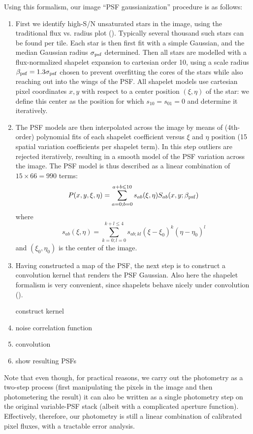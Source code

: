 Using this formalism, our image ``PSF gaussianization'' procedure is as follows:
\begin{enumerate}
\item
First we identify high-S/N unsaturated stars in the image, using the traditional flux vs. radius plot (\cite{KSB}). Typically several thousand such stars can be found per tile. Each star is then first fit with a simple Gaussian, and the median Gaussian radius $\sigma_{\rm psf}$ determined.  
Then all stars are modelled with a flux-normalized shapelet expansion to cartesian order 10, using a scale radius $\beta_{\rm psf}=1.3 \sigma_{\rm psf}$ chosen to prevent overfitting the cores of the stars while also reaching out into the wings of the PSF. All shapelet models use cartesian pixel coordinates $x,y$ with respect to a center position $(\xi,\eta)$ of the star: we define this center as the position for which $s_{10}=s_{01}=0$ and determine it iteratively.
\item
The PSF models are then interpolated across the image by means of (4th-order) polynomial fits of each shapelet coefficient versus $\xi$ and $\eta$ position (15 spatial variation coefficients per shapelet term). In this step outliers are rejected iteratively, resulting in a smooth model of the PSF variation across the image. The PSF model is thus described as a linear combination of $15\times66=990$ terms:
\[
P(x,y,\xi,\eta)=\sum_{a=0;b=0}^{a+b\le10} s_{ab} (\xi,\eta) S_{ab}(x,y;\beta_{\rm psf})
\]
where
\[
s_{ab}(\xi,\eta)=\sum_{k=0;l=0}^{k+l\le4} s_{ab;kl} (\xi-\xi_0)^k (\eta-\eta_0)^l 
\]
and $(\xi_0,\eta_0)$ is the center of the image.
\item
Having constructed a map of the PSF, the next step is to construct a convolution kernel that renders the PSF Gaussian. Also here the shapelet formalism is very convenient, since shapelets behave nicely under convolution (\cite{Regfregier2011}). 

construct kernel
\item 
noise correlation function
\item
convolution
\item
show resulting PSFs
\end{enumerate}

Note that even though, for practical reasons, we carry out the photometry as a two-step process (first manipulating the pixels in the image and then photometering the result) it can also be written as a single photometry step on the original variable-PSF stack (albeit with a complicated aperture function). Effectively, therefore, our photometry is still a linear combination of calibrated pixel fluxes, with a tractable error analysis. 



